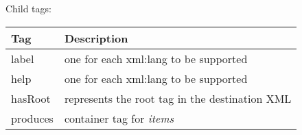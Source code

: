 Child tags:
\begin{center}
	\begin{tabular}{ | p{} | p{} | }
		\hline
		Tag & Description \\ 
		\hline
		label & one for each xml:lang to be supported \\
		help & one for each xml:lang to be supported \\
		\hline
		hasRoot & represents the root tag in the destination XML \\
		\hline
		produces & container tag for \textit{items} \\
		\hline
		
	\end{tabular}
\end{center}

